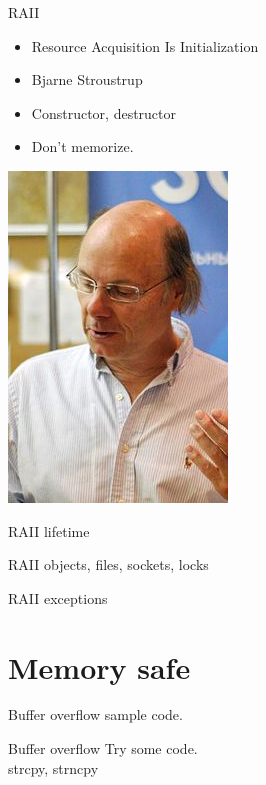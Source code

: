 \documentclass{beamer}
\begin{document}
\begin{CJK*}{UTF8}{bsmi}
    \begin{frame}{RAII}
        \begin{itemize}
            \item Resource Acquisition Is Initialization
            \item Bjarne Stroustrup
            \item Constructor, destructor
            \item Don't memorize.
        \end{itemize}
        \includegraphics[height=.5\textheight]{Bjarne.jpg}
    \end{frame}

    \begin{frame}{RAII}
        lifetime
    \end{frame}

    \begin{frame}{RAII}
        objects, files, sockets, locks
    \end{frame}

    \begin{frame}{RAII}
        exceptions
    \end{frame}

    \section{Memory safe}
    \begin{frame}{Buffer overflow}
        sample code.
    \end{frame}

    \begin{frame}{Buffer overflow}
        Try some code.\\
        strcpy, strncpy
    \end{frame}


\end{CJK*}
\end{document}
